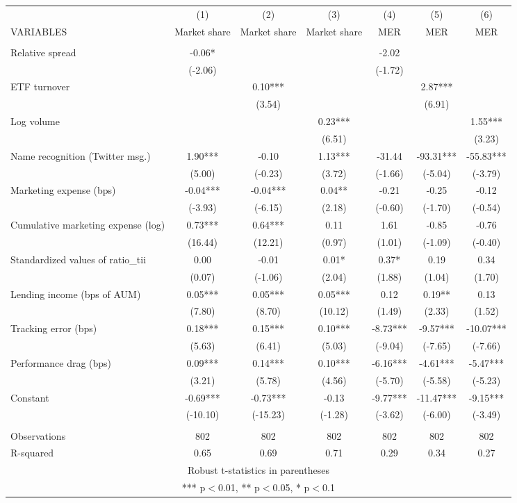\documentclass[]{article}
\begin{document}
\begin{tabular}{lcccccc} \hline
 & (1) & (2) & (3) & (4) & (5) & (6) \\
VARIABLES & Market share & Market share & Market share & MER & MER & MER \\ \hline
 &  &  &  &  &  &  \\
Relative spread & -0.06* &  &  & -2.02 &  &  \\
 & (-2.06) &  &  & (-1.72) &  &  \\
 ETF turnover &  & 0.10*** &  &  & 2.87*** &  \\
 &  & (3.54) &  &  & (6.91) &  \\
Log volume &  &  & 0.23*** &  &  & 1.55*** \\
 &  &  & (6.51) &  &  & (3.23) \\
Name recognition (Twitter msg.) & 1.90*** & -0.10 & 1.13*** & -31.44 & -93.31*** & -55.83*** \\
 & (5.00) & (-0.23) & (3.72) & (-1.66) & (-5.04) & (-3.79) \\
Marketing expense (bps) & -0.04*** & -0.04*** & 0.04** & -0.21 & -0.25 & -0.12 \\
 & (-3.93) & (-6.15) & (2.18) & (-0.60) & (-1.70) & (-0.54) \\
Cumulative marketing expense (log) & 0.73*** & 0.64*** & 0.11 & 1.61 & -0.85 & -0.76 \\
 & (16.44) & (12.21) & (0.97) & (1.01) & (-1.09) & (-0.40) \\
Standardized values of ratio\_tii & 0.00 & -0.01 & 0.01* & 0.37* & 0.19 & 0.34 \\
 & (0.07) & (-1.06) & (2.04) & (1.88) & (1.04) & (1.70) \\
Lending income (bps of AUM) & 0.05*** & 0.05*** & 0.05*** & 0.12 & 0.19** & 0.13 \\
 & (7.80) & (8.70) & (10.12) & (1.49) & (2.33) & (1.52) \\
Tracking error (bps) & 0.18*** & 0.15*** & 0.10*** & -8.73*** & -9.57*** & -10.07*** \\
 & (5.63) & (6.41) & (5.03) & (-9.04) & (-7.65) & (-7.66) \\
Performance drag (bps) & 0.09*** & 0.14*** & 0.10*** & -6.16*** & -4.61*** & -5.47*** \\
 & (3.21) & (5.78) & (4.56) & (-5.70) & (-5.58) & (-5.23) \\

Constant & -0.69*** & -0.73*** & -0.13 & -9.77*** & -11.47*** & -9.15*** \\
 & (-10.10) & (-15.23) & (-1.28) & (-3.62) & (-6.00) & (-3.49) \\
 &  &  &  &  &  &  \\
Observations & 802 & 802 & 802 & 802 & 802 & 802 \\
 R-squared & 0.65 & 0.69 & 0.71 & 0.29 & 0.34 & 0.27 \\ \hline
\multicolumn{7}{c}{ Robust t-statistics in parentheses} \\
\multicolumn{7}{c}{ *** p$<$0.01, ** p$<$0.05, * p$<$0.1} \\
\end{tabular}
\end{document}
